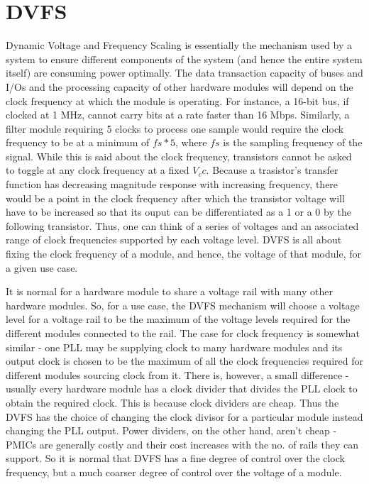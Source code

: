 \chapter{DVFS}
\label{chap:dvfs}
Dynamic Voltage and Frequency Scaling is essentially the mechanism used by a system to ensure different components of the system (and hence the entire system itself) are consuming power optimally. The data transaction capacity of buses and I/Os and the processing capacity of other hardware modules will depend on the clock frequency at which the module is operating. For instance, a 16-bit bus, if clocked at 1 MHz, cannot carry bits at a rate faster than 16 Mbps. Similarly, a filter module requiring 5 clocks to process one sample would require the clock frequency to be at a minimum of $fs*5$, where $fs$ is the sampling frequency of the signal. While this is said about the clock frequency, transistors cannot be asked to toggle at any clock frequency at a fixed $V_cc$. Because a trasistor's transfer function has decreasing magnitude response with increasing frequency, there would be a point in the clock frequency after which the transistor voltage will have to be increased so that its ouput can be differentiated as a 1 or a 0 by the following transistor. Thus, one can think of a series of voltages and an associated range of clock frequencies supported by each voltage level. DVFS is all about fixing the clock frequency of a module, and hence, the voltage of that module, for a given use case. 

It is normal for a hardware module to share a voltage rail with many other hardware modules. So, for a use case, the DVFS mechanism will choose a voltage level for a voltage rail to be the maximum of the voltage levels required for the different modules connected to the rail. The case for clock frequency is somewhat similar - one PLL may be supplying clock to many hardware modules and its output clock is chosen to be the maximum of all the clock frequencies required for different modules sourcing clock from it. There is, however, a small difference - usually every hardware module has a clock divider that divides the PLL clock to obtain the required clock. This is because clock dividers are cheap. Thus the DVFS has the choice of changing the clock divisor for a particular module instead changing the PLL output. Power dividers, on the other hand, aren't cheap - PMICs are generally costly and their cost increases with the no. of rails they can support. So it is normal that DVFS has a fine degree of control over the clock frequency, but a much coarser degree of control over the voltage of a module.

